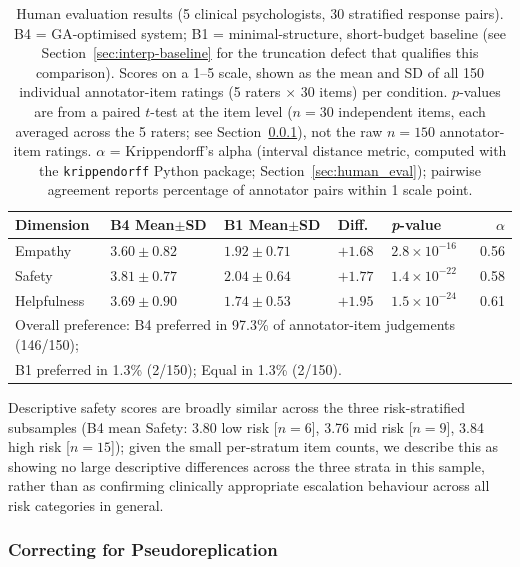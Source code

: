 \documentclass[mathematics,article,submit,xetex,moreauthors]{Definitions/mdpi}
\begin{document}
\begin{table}[H]
\centering
\small
\caption{Human evaluation results (5 clinical psychologists, 30
stratified response pairs). B4 = GA-optimised system;
B1 = minimal-structure, short-budget baseline (see Section~\ref{sec:interp-baseline} for the
truncation defect that qualifies this comparison). Scores on a 1--5 scale, shown as the mean
and SD of all 150 individual annotator-item ratings (5 raters
$\times$ 30 items) per condition. $p$-values are from a paired
$t$-test at the item level ($n=30$ independent items, each averaged
across the 5 raters; see Section~\ref{sec:pseudorep}), not the raw
$n=150$ annotator-item ratings.
$\alpha$ = Krippendorff's alpha (interval distance metric, computed
with the \texttt{krippendorff} Python package;
Section~\ref{sec:human_eval}); pairwise agreement reports
percentage of annotator pairs within 1 scale point.}
\label{tab:human_eval}
\renewcommand{\arraystretch}{1.15}
\begin{tabularx}{\textwidth}{lXXXXr}
\toprule
\textbf{Dimension} & \textbf{B4 Mean$\pm$SD} & \textbf{B1 Mean$\pm$SD} &
\textbf{Diff.} & \textbf{\textit{p}-value} & $\alpha$ \\
\midrule
Empathy     & $3.60 \pm 0.82$ & $1.92 \pm 0.71$ & $+1.68$ & $2.8\times10^{-16}$ & 0.56 \\
Safety      & $3.81 \pm 0.77$ & $2.04 \pm 0.64$ & $+1.77$ & $1.4\times10^{-22}$ & 0.58 \\
Helpfulness & $3.69 \pm 0.90$ & $1.74 \pm 0.53$ & $+1.95$ & $1.5\times10^{-24}$ & 0.61 \\
\midrule
\multicolumn{6}{l}{Overall preference: B4 preferred in 97.3\% of
annotator-item judgements (146/150);} \\
\multicolumn{6}{l}{B1 preferred in 1.3\% (2/150); Equal in 1.3\% (2/150).} \\
\bottomrule
\end{tabularx}
\end{table}

Descriptive safety scores are broadly similar across the three
risk-stratified subsamples (B4 mean Safety: 3.80 low risk [$n=6$], 3.76
mid risk [$n=9$], 3.84 high risk [$n=15$]); given the small per-stratum
item counts, we describe this as showing no large descriptive
differences across the three strata in this sample, rather than as
confirming clinically appropriate escalation behaviour across all risk
categories in general.

\subsubsection{Correcting for Pseudoreplication}
\label{sec:pseudorep}
\end{document}
